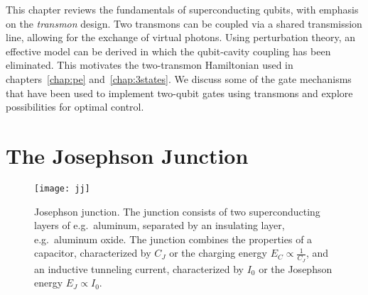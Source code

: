 This chapter reviews the fundamentals of superconducting qubits, with emphasis
on the \emph{transmon} design. Two transmons can be coupled via a shared
transmission line, allowing for the exchange of virtual photons. Using
perturbation theory, an effective model can be derived in which the qubit-cavity
coupling has been eliminated. This motivates the two-transmon Hamiltonian used
in chapters~\ref{chap:pe} and~\ref{chap:3states}.
We discuss some of the gate mechanisms that have been
used to implement two-qubit gates using transmons and explore possibilities for
optimal control.


\section{The Josephson Junction}
\label{sec:jj}

\begin{figure}[htbp]
  \centering
  \texttt{[image: jj]}
  \caption{Josephson junction. The junction consists of two superconducting
  layers of e.g.\ aluminum, separated by an insulating layer, e.g.\ aluminum
  oxide. The junction combines the properties of a capacitor, characterized by
  $C_J$ or the charging energy $E_C \propto \frac{1}{C_J}$, and an inductive
  tunneling current, characterized by $I_0$ or the Josephson energy
  $E_J \propto I_0$.
  }
  \label{fig:jj}
\end{figure}

